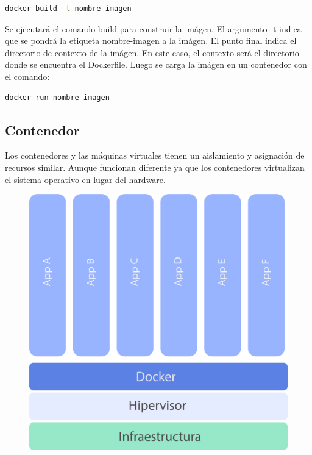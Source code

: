 \begin{lstlisting}[language=bash]
    docker build -t nombre-imagen
\end{lstlisting}

Se ejecutará el comando build para construir la imágen. El argumento -t indica que se pondrá la etiqueta nombre-imagen a la imágen. El punto final indica el directorio de contexto de la imágen. En este caso, el contexto será el directorio donde se encuentra el Dockerfile.
Luego se carga la imágen en un contenedor con el comando:

\begin{lstlisting}[language=bash]
    docker run nombre-imagen
\end{lstlisting}


\subsection[Contenedor]{Contenedor}

Los contenedores y las máquinas virtuales tienen un aislamiento y asignación de recursos similar. Aunque funcionan diferente ya que los contenedores virtualizan el sistema operativo en lugar del hardware.

\begin{figure}[h!]
  \centering
    \includegraphics[scale=0.7]{images/containers.png}
  \label{fig:contvm}
\end{figure}

